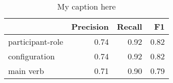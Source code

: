\begin{table}[!ht]
\centering
\begin{tabular}{lrrr}
\toprule
{} &  Precision &  Recall &   F1 \\
\midrule
participant-role &       0.74 &    0.92 & 0.82 \\
configuration    &       0.74 &    0.92 & 0.82 \\
main verb        &       0.71 &    0.90 & 0.79 \\
\bottomrule
\end{tabular}
\caption{My caption here}
\label{tab:unit-elements-transitivity-combined-F1}
\end{table}